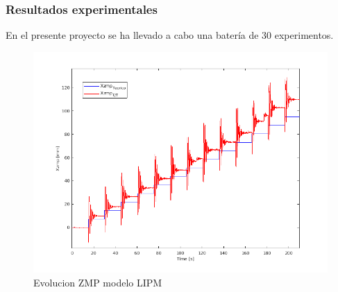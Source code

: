 \subsubsection{Resultados experimentales}

En el presente proyecto se ha llevado a cabo una batería de 30 experimentos.

\begin{figure}[H]
\centering
\includegraphics[scale=0.8]{imagenes/apartado_5/5.1/53_evolucion_zmp_lipm}
\caption{Evolucion ZMP modelo LIPM}
\label{figura53}
\end{figure}

